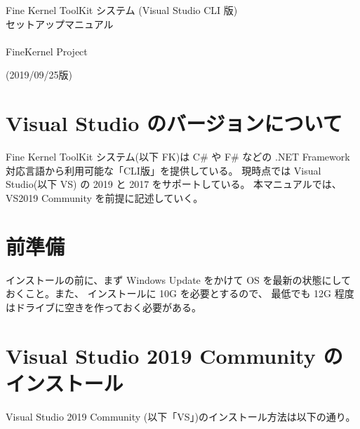 \documentclass[a4paper]{jsarticle}
\begin{document}
\begin{center}
\begin{Large}
Fine Kernel ToolKit システム (Visual Studio CLI 版) \\
	セットアップマニュアル \\ ~ \\
FineKernel Project \\
\end{Large}
(2019/09/25版)
\end{center}

\section{Visual Studio のバージョンについて}
Fine Kernel ToolKit システム(以下 FK)は 
C\# や F\# などの .NET Framework 対応言語から利用可能な「CLI版」を提供している。
現時点では Visual Studio(以下 VS) の 2019 と 2017 をサポートしている。
本マニュアルでは、VS2019 Community を前提に記述していく。

\section{前準備}

インストールの前に、まず Windows Update をかけて
OS を最新の状態にしておくこと。また、
インストールに 10G を必要とするので、
最低でも 12G 程度はドライブに空きを作っておく必要がある。

\section{Visual Studio 2019 Community のインストール}
Visual Studio 2019 Community (以下「VS」)のインストール方法は以下の通り。
\end{document}
